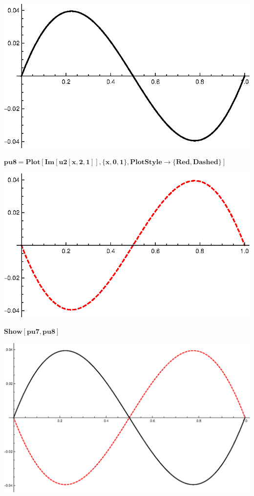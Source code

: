 {\includegraphics{chapters/appendices/KP_Mathematica/Kronig_Penney_model_transfer_matrix_gr17.eps}

\begin{doublespace}
\noindent\(\pmb{\text{pu8}=\text{Plot}[\text{Im}[\text{u2}[x,2,1]],\{x,0,1\},\text{PlotStyle}\to \{\text{Red},\text{Dashed}\}]}\)
\end{doublespace}

\includegraphics{chapters/appendices/KP_Mathematica/Kronig_Penney_model_transfer_matrix_gr18.eps}

\begin{doublespace}
\noindent\(\pmb{\text{Show}[\text{pu7},\text{pu8}]}\)
\end{doublespace}

\includegraphics[width=\textwidth]{chapters/appendices/KP_Mathematica/Kronig_Penney_model_transfer_matrix_gr19.eps}

}
